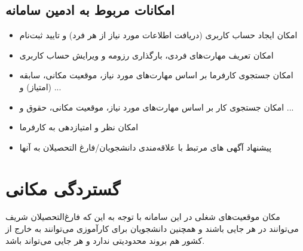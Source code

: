 \subsection{
امکانات مربوط به ادمین سامانه}
\begin{itemize}
	\item 
امکان ایجاد حساب کاربری (دریافت اطلاعات مورد نیاز از هر فرد) و تایید ثبت‌نام 
\item 
امکان تعریف مهارت‌های فردی، بارگذاری رزومه و ویرایش حساب کاربری 
 \item 
امکان جستجوی کارفرما بر اساس مهارت‌های مورد نیاز، موقعیت مکانی، سابقه (امتیاز) و ...  
\item
امکان جستجوی کار بر اساس مهارت‌های مورد نیاز، موقعیت مکانی، حقوق و ...  
 \item 
امکان نظر و امتیازدهی به کارفرما
   \item 
پیشنهاد آگهی های مرتبط با علاقه‌مندی دانشجویان/فارغ التحصیلان به آنها
\end{itemize}

\section{گستردگی مکانی}
مکان موقعیت‌های شغلی در این سامانه با توجه به این که فارغ‌التحصیلان شریف می‌توانند در هر جایی باشند و همچنین دانشجویان برای کارآموزی می‌توانند به خارج از کشور هم بروند محدودیتی ندارد و هر جایی می‌تواند باشد.
